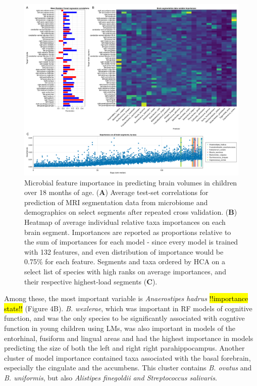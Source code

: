 \documentclass{article}
\begin{document}
\begin{figure}
    \centering
    \includegraphics[width=\textwidth]{assets/Figure4.png}
    \caption{
        Microbial feature importance in predicting brain volumes in children over 18 months of age.
        (\textbf{A}) Average test-set correlations for prediction of MRI segmentation
        data from microbiome and demographics on select segments after repeated
        cross validation. (\textbf{B}) Heatmap of average individual relative taxa
        importances on each brain segment. Importances are reported as
        proportions relative to the sum of importances for each model - since
        every model is trained with 132 features, and even distribution of
        importance would be 0.75\% for each feature. Segments and taxa ordered
        by HCA on a select list of species with high ranks on average importances,
        and their respective highest-load segments (\textbf{C}).
    }
    \label{fig:4}
\end{figure}

Among these, the most important variable is \emph{Anaerostipes hadrus}
\hl{!!importance stats!!} (Figure 4B).
\emph{B. wexlerae}, which was important in RF models of cognitive function,
and was the only species to be significantly associated
with cogntive function in young children using LMs, 
was also important in models of the entorhinal, fusiform and lingual areas
and had the highest importance in models predicting the size of
both the left and right right parahippocampus.
Another cluster of model importance contained taxa associated with the
basal forebrain, especially the cingulate and the accumbens. This
cluster contains \emph{B. ovatus} and \emph{B. uniformis},
but also \emph{Alistipes finegoldii and Streptococcus salivaris}.
\end{document}
